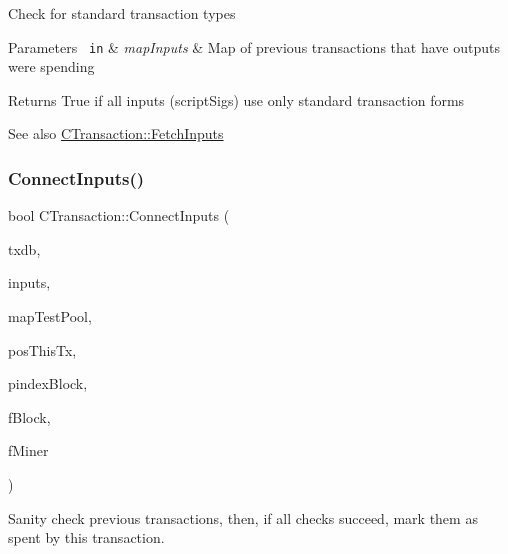 Check for standard transaction types 
\begin{DoxyParams}[1]{Parameters}
\mbox{\texttt{ in}}  & {\em map\+Inputs} & Map of previous transactions that have outputs we\textquotesingle{}re spending \\
\hline
\end{DoxyParams}
\begin{DoxyReturn}{Returns}
True if all inputs (script\+Sigs) use only standard transaction forms 
\end{DoxyReturn}
\begin{DoxySeeAlso}{See also}
\mbox{\hyperlink{class_c_transaction_a5a4967303d3b588a120687f3ed1f4b0a}{C\+Transaction\+::\+Fetch\+Inputs}} 
\end{DoxySeeAlso}
\mbox{\label{class_c_transaction_ad066817ad4fef65c5473cd4a6762e244}} 
\subsubsection{\texorpdfstring{ConnectInputs()}{ConnectInputs()}}
{\footnotesize\ttfamily bool C\+Transaction\+::\+Connect\+Inputs (\begin{DoxyParamCaption}\item[{\mbox{\hyperlink{class_c_tx_d_b}{C\+Tx\+DB}} \&}]{txdb,  }\item[{Map\+Prev\+Tx}]{inputs,  }\item[{std\+::map$<$ \mbox{\hyperlink{classuint256}{uint256}}, \mbox{\hyperlink{class_c_tx_index}{C\+Tx\+Index}} $>$ \&}]{map\+Test\+Pool,  }\item[{const \mbox{\hyperlink{class_c_disk_tx_pos}{C\+Disk\+Tx\+Pos}} \&}]{pos\+This\+Tx,  }\item[{const \mbox{\hyperlink{class_c_block_index}{C\+Block\+Index}} $\ast$}]{pindex\+Block,  }\item[{bool}]{f\+Block,  }\item[{bool}]{f\+Miner }\end{DoxyParamCaption})}

Sanity check previous transactions, then, if all checks succeed, mark them as spent by this transaction.



